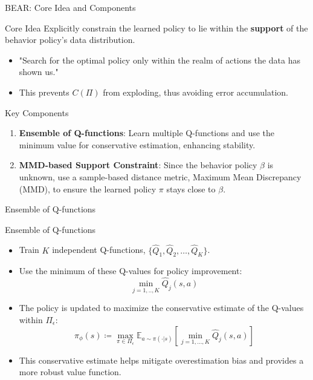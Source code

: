 \documentclass[11pt]{beamer}
\newcommand{\mbb}[1]{\mathbb{#1}}
\newcommand{\tb}[1]{\textbf{#1}}
\begin{document}
\begin{frame}{BEAR: Core Idea and Components}
    \begin{block}{Core Idea}
        Explicitly constrain the learned policy to lie within the \tb{support} of the behavior policy's data distribution.
        \begin{itemize}
            \item "Search for the optimal policy only within the realm of actions the data has shown us."
            \item This prevents $C(\Pi)$ from exploding, thus avoiding error accumulation.
        \end{itemize}
    \end{block}

    \begin{block}{Key Components}
        \begin{enumerate}
            \item \tb{Ensemble of Q-functions}: Learn multiple Q-functions and use the minimum value for conservative estimation, enhancing stability.
            \item \tb{MMD-based Support Constraint}: Since the behavior policy $\beta$ is unknown, use a sample-based distance metric, Maximum Mean Discrepancy (MMD), to ensure the learned policy $\pi$ stays close to $\beta$.
        \end{enumerate}
    \end{block}
\end{frame}

\begin{frame}{Ensemble of Q-functions}
    \begin{block}{Ensemble of Q-functions}
        \begin{itemize}
            \item Train $K$ independent Q-functions, $\{\hat{Q}_1, \hat{Q}_2, \dots, \hat{Q}_K\}$.
            \item Use the minimum of these Q-values for policy improvement:
            \[ \min_{j=1,..,K} \hat{Q}_j(s,a) \]
            \item The policy is updated to maximize the conservative estimate of the Q-values within $\Pi_\epsilon$:
            \[\pi_\phi (s) \coloneqq \max_{\pi \in \Pi_\epsilon} \mbb{E}_{a \sim \pi(\cdot|s)}\left[ \min_{j=1,\dots,K} \hat{Q}_j(s,a)\right]\]
            \item This conservative estimate helps mitigate overestimation bias and provides a more robust value function.
        \end{itemize}
    \end{block}
\end{frame}
\end{document}
